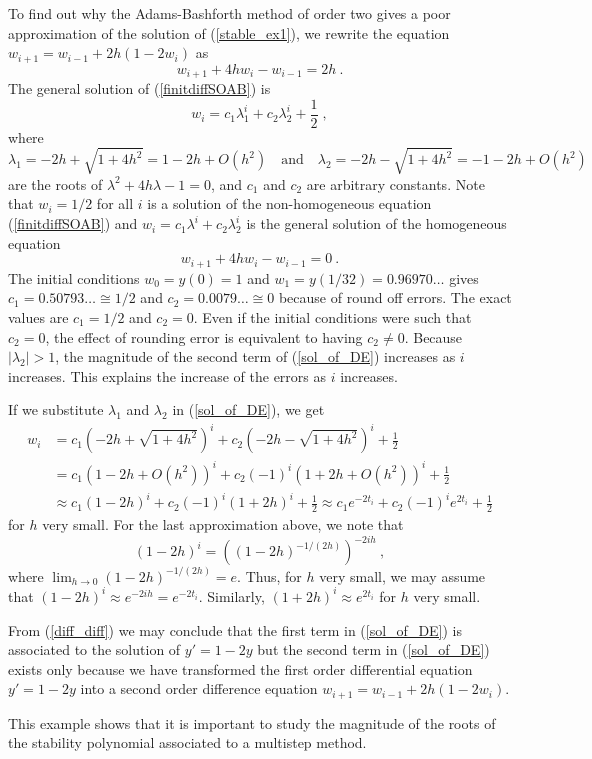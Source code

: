 \begin{egg}
To find out why the Adams-Bashforth method of order two gives a poor
approximation of the solution of (\ref{stable_ex1}), we
rewrite the equation $w_{i+1} = w_{i-1} + 2h(1-2w_i)$ as
\begin{equation}\label{finitdiffSOAB}
  w_{i+1} + 4hw_i -w_{i-1} = 2h \ .
\end{equation}
The general solution of (\ref{finitdiffSOAB}) is
\begin{equation} \label{sol_of_DE}
w_i = c_1\lambda_1^i + c_2\lambda_2^i + \frac{1}{2} \;  ,
\end{equation}
where
\[
\lambda_1 =-2h+\sqrt{1+4h^2} = 1-2h+O(h^2)
\quad \text{and} \quad 
\lambda_2 =-2h-\sqrt{1+4h^2} = -1-2h+O(h^2)
\]
are the roots of $\lambda^2 + 4h\lambda -1 =0$, and $c_1$ and $c_2$
are arbitrary constants.  Note that $w_i= 1/2$ for all $i$ is a
solution of the non-homogeneous equation (\ref{finitdiffSOAB}) and
$w_i =c_1\lambda^i + c_2\lambda_2^i$ is the general solution of
the homogeneous equation
\[
  w_{i+1} + 4hw_i -w_{i-1} = 0 \ .
\]
The initial conditions $w_0=y(0)=1$ and $w_1=y(1/32) = 0.96970\ldots$
gives $c_1 = 0.50793\ldots \cong 1/2$ and $c_2 = 0.0079\ldots \cong 0$
because of round off errors.  The exact values are $c_1=1/2$
and $c_2=0$.  Even if the initial conditions were such that $c_2 =0$,
the effect of rounding error is equivalent to having $c_2 \neq 0$.
Because $|\lambda_2| >1$, the magnitude of the second term of
(\ref{sol_of_DE}) increases as $i$ increases.  This explains the
increase of the errors as $i$ increases.

If we substitute $\lambda_1$ and $\lambda_2$ in (\ref{sol_of_DE}),
we get
\begin{align}
w_i &= c_1 \left(-2h+\sqrt{1+4h^2} \right)^i
 + c_2 \left(-2h-\sqrt{1+4h^2} \right)^i + \frac{1}{2} \nonumber \\
&= c_1 \left(1-2h+O(h^2) \right)^i
 + c_2 (-1)^i \left(1+2h+O(h^2) \right)^i + \frac{1}{2} \nonumber \\
&\approx c_1 \left(1-2h \right)^i
 + c_2 (-1)^i \left(1+2h\right)^i + \frac{1}{2}
\approx c_1 e^{-2t_i} + c_2 (-1)^i e^{2t_i} + \frac{1}{2} \label{diff_diff}
\end{align}
for $h$ very small.  For the last approximation above, we note
that
\[
  (1-2h)^i = \left( (1-2h)^{-1/(2h)}\right)^{-2 i h} \ ,
\]
where $\displaystyle \lim_{h\to 0} (1-2h)^{-1/(2h)} = e$.  Thus, for
$h$ very small, we may assume that
$\displaystyle (1-2h)^i \approx e^{-2 i h} = e^{-2t_i}$.
Similarly, $(1+2h)^i \approx e^{2 t_i}$ for $h$ very small.

From (\ref{diff_diff}) we may conclude that the first term in
(\ref{sol_of_DE}) is associated to the solution of $y'=1-2y$ but the
second term in (\ref{sol_of_DE}) exists only because we have
transformed the first order differential equation $y'=1-2y$ into a
second order difference equation $w_{i+1} = w_{i-1} +2h(1-2w_i)$.

This example shows that it is important to study the magnitude of the
roots of the stability polynomial associated to a multistep method.
\label{Roundoff_effect}
\end{egg}

